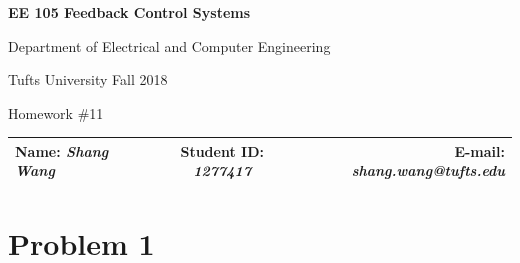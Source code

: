 \documentclass[a4paper]{article}
\begin{document}
\begin{center}
\bf\Large
EE 105 Feedback Control Systems\par
Department of Electrical and Computer Engineering\par
Tufts University Fall 2018\par
Homework \#11\par   
\end{center}
\begin{table}[H]
\begin{center}
\begin{tabular*}{\textwidth}{@{\extracolsep{\fill}}lcr}
Name: {\it Shang Wang} &Student ID: {\it 1277417} &E-mail: {\it shang.wang@tufts.edu}\\
\hline
\end{tabular*}
\end{center}
\end{table}




\section{Problem 1}
\end{document}
